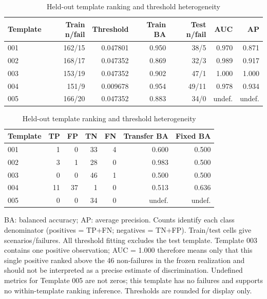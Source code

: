 \begin{table}[htbp]\centering\small
\caption{Held-out template ranking and threshold heterogeneity}\label{tab:T4}
\begin{tabular}{lrrrrrr}
\toprule
Template & Train n/fail & Threshold & Train BA & Test n/fail & AUC & AP \\
\midrule
001 & 162/15 & 0.047801 & 0.950 & 38/5 & 0.970 & 0.871 \\
002 & 168/17 & 0.047352 & 0.869 & 32/3 & 0.989 & 0.917 \\
003 & 153/19 & 0.047352 & 0.902 & 47/1 & 1.000 & 1.000 \\
004 & 151/9 & 0.009678 & 0.954 & 49/11 & 0.978 & 0.934 \\
005 & 166/20 & 0.047352 & 0.883 & 34/0 & undef. & undef. \\
\bottomrule
\end{tabular}
\medskip

\begin{tabular}{lrrrrrr}
\toprule
Template & TP & FP & TN & FN & Transfer BA & Fixed BA \\
\midrule
001 & 1 & 0 & 33 & 4 & 0.600 & 0.500 \\
002 & 3 & 1 & 28 & 0 & 0.983 & 0.500 \\
003 & 0 & 0 & 46 & 1 & 0.500 & 0.500 \\
004 & 11 & 37 & 1 & 0 & 0.513 & 0.636 \\
005 & 0 & 0 & 34 & 0 & undef. & undef. \\
\bottomrule
\end{tabular}
\par\smallskip
\begin{minipage}{\linewidth}\footnotesize BA: balanced accuracy; AP: average precision. Counts identify each class denominator (positives = TP+FN; negatives = TN+FP). Train/test cells give scenarios/failures. All threshold fitting excludes the test template. Template 003 contains one positive observation; AUC = 1.000 therefore means only that this single positive ranked above the 46 non-failures in the frozen realization and should not be interpreted as a precise estimate of discrimination. Undefined metrics for Template 005 are not zeros; this template has no failures and supports no within-template ranking inference. Thresholds are rounded for display only.\end{minipage}
\end{table}

